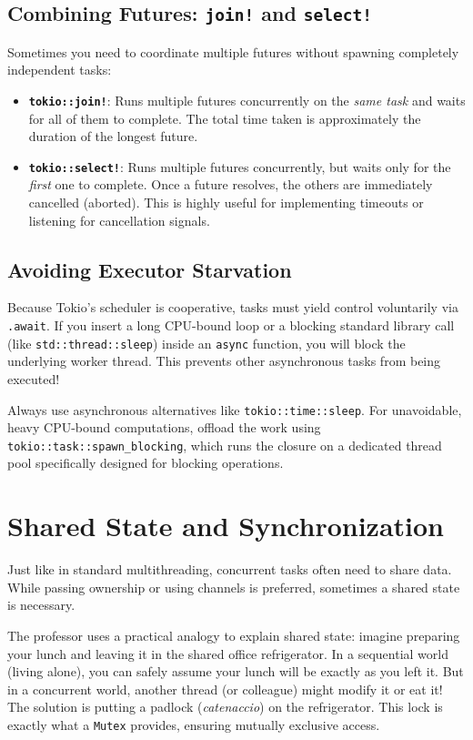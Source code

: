 \subsection{Combining Futures: \texttt{join!} and \texttt{select!}}
Sometimes you need to coordinate multiple futures without spawning completely independent tasks:
\begin{itemize}
    \item \textbf{\texttt{tokio::join!}}: Runs multiple futures concurrently on the \textit{same task} and waits for all of them to complete. The total time taken is approximately the duration of the longest future.
    \item \textbf{\texttt{tokio::select!}}: Runs multiple futures concurrently, but waits only for the \textit{first} one to complete. Once a future resolves, the others are immediately cancelled (aborted). This is highly useful for implementing timeouts or listening for cancellation signals.
\end{itemize}

\subsection{Avoiding Executor Starvation}
Because Tokio's scheduler is cooperative, tasks must yield control voluntarily via \texttt{.await}. If you insert a long CPU-bound loop or a blocking standard library call (like \texttt{std::thread::sleep}) inside an \texttt{async} function, you will block the underlying worker thread. This prevents other asynchronous tasks from being executed!

Always use asynchronous alternatives like \texttt{tokio::time::sleep}. For unavoidable, heavy CPU-bound computations, offload the work using \texttt{tokio::task::spawn\_blocking}, which runs the closure on a dedicated thread pool specifically designed for blocking operations.

\section{Shared State and Synchronization}

Just like in standard multithreading, concurrent tasks often need to share data. While passing ownership or using channels is preferred, sometimes a shared state is necessary. 

The professor uses a practical analogy to explain shared state: imagine preparing your lunch and leaving it in the shared office refrigerator. In a sequential world (living alone), you can safely assume your lunch will be exactly as you left it. But in a concurrent world, another thread (or colleague) might modify it or eat it! The solution is putting a padlock (\textit{catenaccio}) on the refrigerator. This lock is exactly what a \texttt{Mutex} provides, ensuring mutually exclusive access.

